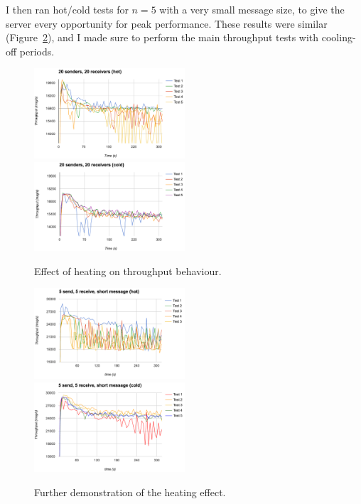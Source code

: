 I then ran hot/cold tests for $n=5$ with a very small message size, to give the server every opportunity for peak performance. These results were similar (Figure~\ref{fig:5hotcold}), and I made sure to perform the main throughput tests with cooling-off periods.

\begin{figure}
  \includegraphics[width=0.5\textwidth]{../transcripts/lipsum/20n20/hot/hot.png}
  \includegraphics[width=0.5\textwidth]{../transcripts/lipsum/20n20/cold/cold.png}
  \caption{Effect of heating on throughput behaviour.}
  \label{fig:20hotcold}
\end{figure}

\begin{figure}
  \includegraphics[width=0.5\textwidth]{../transcripts/hi/5n5/hot/hot.png}
  \includegraphics[width=0.5\textwidth]{../transcripts/hi/5n5/cold/cold.png}
  \caption{Further demonstration of the heating effect.}
  \label{fig:5hotcold}
\end{figure}

